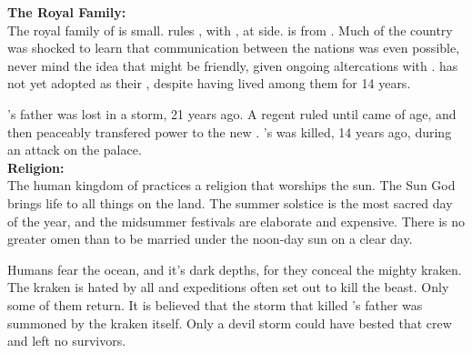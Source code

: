 \documentclass[blue]{NeptuneBall}
\begin{document}
\name{\bHumanShort{}}
%
%
{\bf The Royal Family:}\\
The royal family of \pAmerica{} is small. \cEric{\King} \cEric{} rules \pAmerica{}, with \cEric{\their} \cAriel{\spouse}, \cAriel{\King} \cAriel{} at \cEric{\their} side. \cAriel{} is from \pAtlantis{}. Much of the country was shocked to learn that communication between the nations was even possible, never mind the idea that \pAtlantis{} might be friendly, given ongoing altercations with \pPacifica{}. \pAmerica{} has not yet adopted \cAriel{} as their \cAriel{\King}, despite \cAriel{\their} having lived among them for 14 years. 

\cEric{}'s father was lost in a storm, 21 years ago. A regent ruled until \cEric{} came of age, and then peaceably transfered power to the new \cEric{\King}. \cEric{}'s \cSlave{\sibling} was killed, 14 years ago, during an attack on the palace.\\

{\bf Religion:}\\
The human kingdom of \pAmerica{} practices a religion that worships the sun. The Sun God brings life to all things on the land. The summer solstice is the most sacred day of the year, and the midsummer festivals are elaborate and expensive. There is no greater omen than to be married under the noon-day sun on a clear day.

Humans fear the ocean, and it's dark depths, for they conceal the mighty kraken. The kraken is hated by all and expeditions often set out to kill the beast. Only some of them return. It is believed that the storm that killed \cEric{}'s father was summoned by the kraken itself. Only a devil storm could have bested that crew and left no survivors.\\
\end{document}
